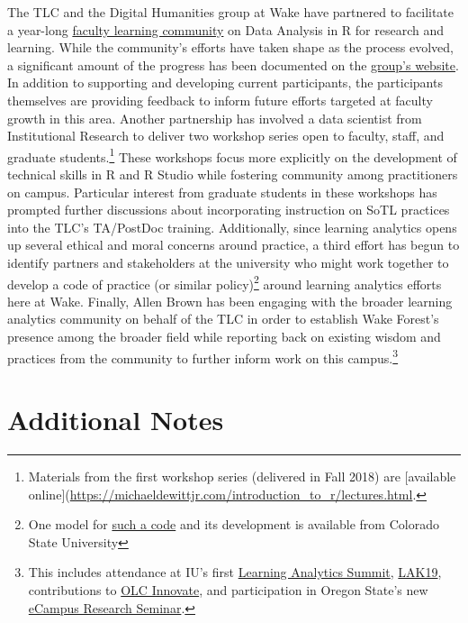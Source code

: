 \documentclass[]{tufte-handout}
\begin{document}
The TLC and the Digital Humanities group at Wake have partnered to
facilitate a year-long \href{https://tlc.wfu.edu/r}{faculty learning
community} on Data Analysis in R for research and learning. While the
community's efforts have taken shape as the process evolved, a
significant amount of the progress has been documented on the
\href{https://wfu-tlc.github.io/sessions.html}{group's website}. In
addition to supporting and developing current participants, the
participants themselves are providing feedback to inform future efforts
targeted at faculty growth in this area. Another partnership has
involved a data scientist from Institutional Research to deliver two
workshop series open to faculty, staff, and graduate students.\footnote{Materials
  from the first workshop series (delivered in Fall 2018) are
  {[}available
  online{]}(\url{https://michaeldewittjr.com/introduction_to_r/lectures.html}.}
These workshops focus more explicitly on the development of technical
skills in R and R Studio while fostering community among practitioners
on campus. Particular interest from graduate students in these workshops
has prompted further discussions about incorporating instruction on SoTL
practices into the TLC's TA/PostDoc training. Additionally, since
learning analytics opens up several ethical and moral concerns around
practice, a third effort has begun to identify partners and stakeholders
at the university who might work together to develop a code of practice
(or similar policy)\footnote{One model for
  \href{https://www.csu.edu.au/__data/assets/pdf_file/0007/2160484/2016_CSU_LearningAnalyticsCodePractice.pdf}{such
  a code} and its development is available from Colorado State
  University} around learning analytics efforts here at Wake. Finally,
Allen Brown has been engaging with the broader learning analytics
community on behalf of the TLC in order to establish Wake Forest's
presence among the broader field while reporting back on existing wisdom
and practices from the community to further inform work on this
campus.\footnote{This includes attendance at IU's first
  \href{https://lasummit.indiana.edu/}{Learning Analytics Summit},
  \href{https://lak19.solaresearch.org}{LAK19}, contributions to
  \href{https://onlinelearningconsortium.org/olc-innovate-2019-session-page/?session=6720\&kwds=}{OLC
  Innovate}, and participation in Oregon State's new
  \href{https://ecampus.oregonstate.edu/research/opportunities/online-teaching-learning-research-seminars/}{eCampus
  Research Seminar}.}

\section{Additional Notes}\label{additional-notes}
\end{document}
